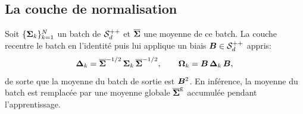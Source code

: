
\subsection{La couche de normalisation}
\label{sec:spdnet-batchnorm-couche}

\begin{definition}
\label{def:spdnet-batchnorm}
  Soit $\{\boldsymbol{\Sigma}_k\}_{k=1}^{N}$ un batch de $\mathcal{S}_{d}^{++}$ et $\overline{\boldsymbol{\Sigma}}$
  une moyenne de ce batch. La couche recentre le batch en l'identité puis lui
  applique un biais $\boldsymbol{B}\in\mathcal{S}_{d}^{++}$ appris:
  \begin{equation}
    \boldsymbol{\Delta}_k
    =
    \overline{\boldsymbol{\Sigma}}^{-1/2}\,\boldsymbol{\Sigma}_k\,\overline{\boldsymbol{\Sigma}}^{-1/2},
    \qquad
    \boldsymbol{\Omega}_k
    =
    \boldsymbol{B}\,\boldsymbol{\Delta}_k\,\boldsymbol{B},
    \label{eq:spdnet-batchnorm}
  \end{equation}
  de sorte que la moyenne du batch de sortie est $\boldsymbol{B}^2$. En inférence, la
  moyenne du batch est remplacée par une moyenne globale $\overline{\boldsymbol{\Sigma}}^{\mathrm{g}}$ accumulée
  pendant l'apprentissage.
\end{definition}

